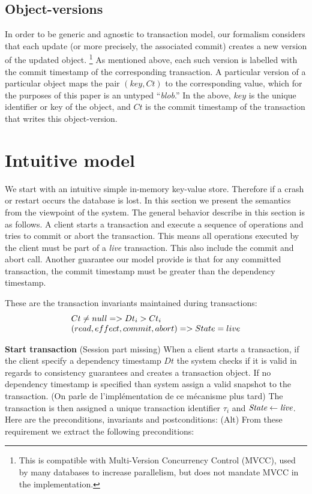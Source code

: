 \documentclass[systeme,french,english]{compas2022}
\begin{document}
\subsection{Object-versions}

In order to be generic and agnostic to transaction model, our formalism
considers that each update (or more precisely, the associated commit)
creates a new version of the updated object.%
%
\footnote{
%
  This is compatible with Multi-Version Concurrency Control (MVCC), used
  by many databases to increase parallelism, but does not mandate MVCC
  in the implementation.
}
%
As mentioned above, each such version is labelled with the commit
timestamp of the corresponding transaction.
A particular version of a particular object maps the pair
$(\mathit{key},\mathit{Ct})$ to the corresponding value, which for the
purposes of this paper is an untyped ``\emph{blob}.''
In the above, $\mathit{key}$ is the unique identifier or key of the
object, and $\mathit{Ct}$ is the commit timestamp of the transaction
that writes this object-version.

\section{Intuitive model}

We start with an intuitive simple in-memory key-value store.
Therefore if a crash or restart occurs the database is lost.
In this section we present the semantics from the viewpoint of the system.
The general behavior describe in this section is as follows.
A client starts a transaction and execute a sequence of operations and tries to commit or abort the transaction.
This means all operations executed by the client must be part of a \emph{live} transaction.
This also include the commit and abort call.
Another guarantee our model provide is that for any committed transaction, the commit timestamp must be greater than the dependency timestamp.

These are the transaction invariants maintained during transactions:
\[
  \begin{array}{lcl}
    \emph{$Ct \neq null => Dt_i > Ct_i$}\\
    \emph{$(read, effect, commit, abort) => State = live$}
  \end{array} 
\]



\textbf{Start transaction} (Session part missing)
When a client starts a transaction, if the client specify a dependency timestamp $Dt$ the system checks if it is valid in regards to consistency guarantees and creates a transaction object.
If no dependency timestamp is specified than system assign a valid snapshot to the transaction.
(On parle de l'implémentation de ce mécanisme plus tard)
The transaction is then assigned a unique transaction identifier $\tau_i$ and $\emph{State} \leftarrow \emph{live}$.
Here are the preconditions, invariants and postconditions:
(Alt) From these requirement we extract the following preconditions:
\end{document}
